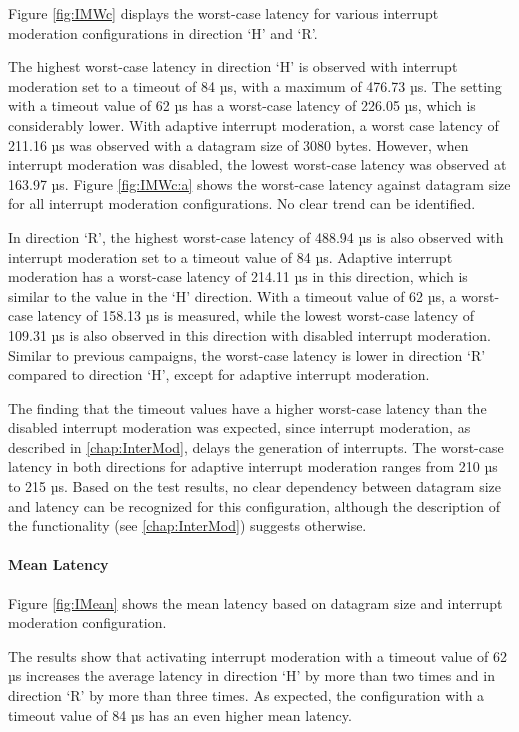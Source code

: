 Figure \ref{fig:IMWc} displays the worst-case latency for various interrupt moderation configurations in direction `H' and `R'.

The highest worst-case latency in direction `H' is observed with interrupt moderation set to a timeout of 84 µs, with a maximum of 476.73 µs. The setting with a timeout value of 62 µs has a worst-case latency of 226.05 µs, which is considerably lower. With adaptive interrupt moderation, a worst case latency of 211.16 µs was observed with a datagram size of 3080 bytes. However, when interrupt moderation was disabled, the lowest worst-case latency was observed at 163.97 µs. Figure \ref{fig:IMWc:a} shows the worst-case latency against datagram size for all interrupt moderation configurations. No clear trend can be identified.

In direction `R', the highest worst-case latency of 488.94 µs is also observed with interrupt moderation set to a timeout value of 84 µs. Adaptive interrupt moderation has a worst-case latency of 214.11 µs in this direction, which is similar to the value in the `H' direction. With a timeout value of 62 µs, a worst-case latency of 158.13 µs is measured, while the lowest worst-case latency of 109.31 µs is also observed in this direction with disabled interrupt moderation. Similar to previous campaigns, the worst-case latency is lower in direction `R' compared to direction `H', except for adaptive interrupt moderation.

The finding that the timeout values have a higher worst-case latency than the disabled interrupt moderation was expected, since interrupt moderation, as described in \ref{chap:InterMod}, delays the generation of interrupts.  The worst-case latency in both directions for adaptive interrupt moderation ranges from 210 µs to 215 µs. Based on the test results, no clear dependency between datagram size and latency can be recognized for this configuration, although the description of the functionality (see \ref{chap:InterMod}) suggests otherwise.

\paragraph{Mean Latency}

Figure \ref{fig:IMean} shows the mean latency based on datagram size and interrupt moderation configuration.

The results show that activating interrupt moderation with a timeout value of 62 µs increases the average latency in direction `H' by more than two times and in direction `R' by more than three times. As expected, the configuration with a timeout value of 84 µs has an even higher mean latency.

